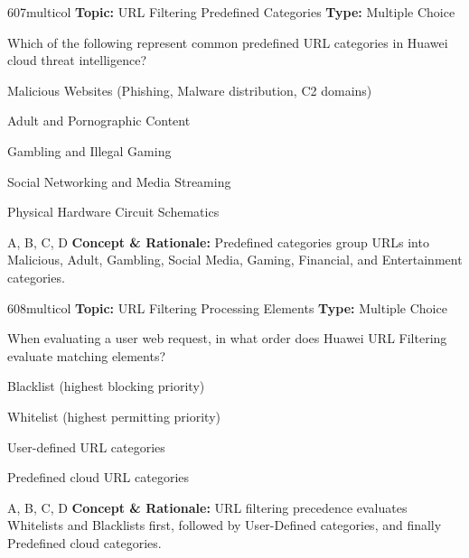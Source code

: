 \begin{qcard}{607}{multicol}
\textcolor{darkslate!75}{\small\textbf{Topic:} URL Filtering Predefined Categories \hfill \textbf{Type:} Multiple Choice}\vspace{0.4em}\par
Which of the following represent common predefined URL categories in Huawei cloud threat intelligence?
\begin{qoptions}
\item Malicious Websites (Phishing, Malware distribution, C2 domains)
\item Adult and Pornographic Content
\item Gambling and Illegal Gaming
\item Social Networking and Media Streaming
\item Physical Hardware Circuit Schematics
\end{qoptions}
\end{qcard}
\nopagebreak
\begin{explainbox}{A, B, C, D}
\textbf{Concept \& Rationale:} Predefined categories group URLs into Malicious, Adult, Gambling, Social Media, Gaming, Financial, and Entertainment categories.
\end{explainbox}

\begin{qcard}{608}{multicol}
\textcolor{darkslate!75}{\small\textbf{Topic:} URL Filtering Processing Elements \hfill \textbf{Type:} Multiple Choice}\vspace{0.4em}\par
When evaluating a user web request, in what order does Huawei URL Filtering evaluate matching elements?
\begin{qoptions}
\item Blacklist (highest blocking priority)
\item Whitelist (highest permitting priority)
\item User-defined URL categories
\item Predefined cloud URL categories
\end{qoptions}
\end{qcard}
\nopagebreak
\begin{explainbox}{A, B, C, D}
\textbf{Concept \& Rationale:} URL filtering precedence evaluates Whitelists and Blacklists first, followed by User-Defined categories, and finally Predefined cloud categories.
\end{explainbox}

